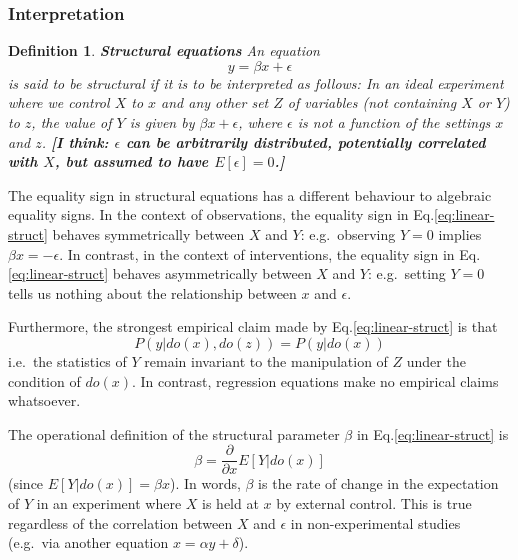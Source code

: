 \documentclass[11pt]{article}
\numberwithin{equation}{section}
\newtheorem{defn}{Definition}[section]
\begin{document}
\subsubsection{Interpretation}

\begin{defn}
\textbf{Structural equations} An equation 
\begin{equation}
y=\beta x + \epsilon \label{eq:linear-struct}
\end{equation}
is said to be structural if it is to be interpreted as follows: In an ideal experiment where we control $X$ to $x$ and any other set $Z$ of variables (not containing $X$ or $Y$) to $z$, the value of $Y$ is given by $\beta x + \epsilon$, where $\epsilon$ is not a function of the settings $x$ and $z$. \textbf{[I think: $\epsilon$ can be arbitrarily distributed, potentially correlated with $X$, but assumed to have $E[\epsilon]=0$.]}
\end{defn}

The equality sign in structural equations has a different behaviour to algebraic equality signs. In the context of observations, the equality sign in Eq.\eqref{eq:linear-struct} behaves symmetrically between $X$ and $Y$: e.g.\ observing $Y=0$ implies $\beta x = -\epsilon$. In contrast, in the context of interventions, the equality sign in Eq.\eqref{eq:linear-struct} behaves asymmetrically between $X$ and $Y$: e.g.\ setting $Y=0$ tells us nothing about the relationship between $x$ and $\epsilon$. 

Furthermore, the strongest empirical claim made by Eq.\eqref{eq:linear-struct} is that
\begin{equation}
P(y|do(x), do(z)) = P(y|do(x))
\end{equation}
i.e.\ the statistics of $Y$ remain invariant to the manipulation of $Z$ under the condition of $do(x)$. In contrast, regression equations make no empirical claims whatsoever.

The operational definition of the structural parameter $\beta$ in Eq.\eqref{eq:linear-struct} is
\begin{equation}
\beta = \frac{\partial}{\partial x}E[Y|do(x)]
\end{equation}
(since $E[Y|do(x)]=\beta x$). In words, $\beta$ is the rate of change in the expectation of $Y$ in an experiment where $X$ is held at $x$ by external control. This is true regardless of the correlation between $X$ and $\epsilon$ in non-experimental studies (e.g.\ via another equation $x=\alpha y + \delta$).
\end{document}
